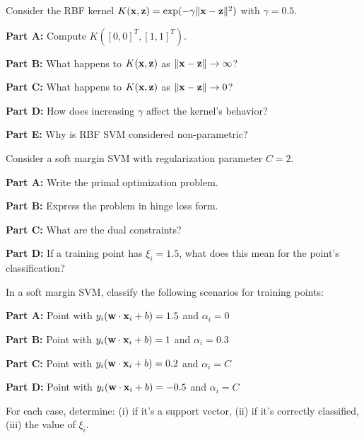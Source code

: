 \documentclass{article}
\newcounter{exercise}
\begin{document}
\begin{tcolorbox}[colback=blue!5!white,colframe=blue!75!black,title=Exercise \theexercise: RBF Kernel Properties]
Consider the RBF kernel $K(\mathbf{x}, \mathbf{z}) = \exp(-\gamma \|\mathbf{x} - \mathbf{z}\|^2)$ with $\gamma = 0.5$.

\textbf{Part A:} Compute $K([0, 0]^T, [1, 1]^T)$.

\textbf{Part B:} What happens to $K(\mathbf{x}, \mathbf{z})$ as $\|\mathbf{x} - \mathbf{z}\| \rightarrow \infty$?

\textbf{Part C:} What happens to $K(\mathbf{x}, \mathbf{z})$ as $\|\mathbf{x} - \mathbf{z}\| \rightarrow 0$?

\textbf{Part D:} How does increasing $\gamma$ affect the kernel's behavior?

\textbf{Part E:} Why is RBF SVM considered non-parametric?
\end{tcolorbox}

\begin{tcolorbox}[colback=blue!5!white,colframe=blue!75!black,title=Exercise \theexercise: Soft Margin Formulation]
Consider a soft margin SVM with regularization parameter $C = 2$.

\textbf{Part A:} Write the primal optimization problem.

\textbf{Part B:} Express the problem in hinge loss form.

\textbf{Part C:} What are the dual constraints?

\textbf{Part D:} If a training point has $\xi_i = 1.5$, what does this mean for the point's classification?
\end{tcolorbox}

\begin{tcolorbox}[colback=blue!5!white,colframe=blue!75!black,title=Exercise \theexercise: Support Vector Analysis]
In a soft margin SVM, classify the following scenarios for training points:

\textbf{Part A:} Point with $y_i(\mathbf{w} \cdot \mathbf{x}_i + b) = 1.5$ and $\alpha_i = 0$

\textbf{Part B:} Point with $y_i(\mathbf{w} \cdot \mathbf{x}_i + b) = 1$ and $\alpha_i = 0.3$

\textbf{Part C:} Point with $y_i(\mathbf{w} \cdot \mathbf{x}_i + b) = 0.2$ and $\alpha_i = C$

\textbf{Part D:} Point with $y_i(\mathbf{w} \cdot \mathbf{x}_i + b) = -0.5$ and $\alpha_i = C$

For each case, determine: (i) if it's a support vector, (ii) if it's correctly classified, (iii) the value of $\xi_i$.
\end{tcolorbox}
\end{document}
